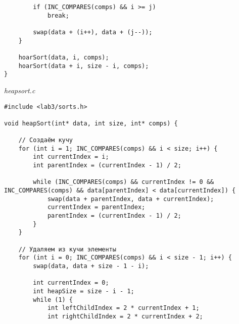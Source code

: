 \documentclass[a4paper,14pt]{extarticle}
\begin{document}
\begin{enumerate}
\begin{verbatim}
        if (INC_COMPARES(comps) && i >= j)
            break;

        swap(data + (i++), data + (j--));
    }

    hoarSort(data, i, comps);
    hoarSort(data + i, size - i, comps);
}
	\end{verbatim}
	      \textit{heapsort.c}
	      \begin{verbatim}
#include <lab3/sorts.h>

void heapSort(int* data, int size, int* comps) {
    
    // Создаём кучу
    for (int i = 1; INC_COMPARES(comps) && i < size; i++) {
        int currentIndex = i;
        int parentIndex = (currentIndex - 1) / 2;

        while (INC_COMPARES(comps) && currentIndex != 0 && INC_COMPARES(comps) && data[parentIndex] < data[currentIndex]) {
            swap(data + parentIndex, data + currentIndex);
            currentIndex = parentIndex;
            parentIndex = (currentIndex - 1) / 2;
        }    
    }

    // Удаляем из кучи элементы
    for (int i = 0; INC_COMPARES(comps) && i < size - 1; i++) {
        swap(data, data + size - 1 - i);

        int currentIndex = 0;
        int heapSize = size - i - 1;
        while (1) {
            int leftChildIndex = 2 * currentIndex + 1; 
            int rightChildIndex = 2 * currentIndex + 2;


\end{verbatim}
\end{enumerate}
\end{document}
